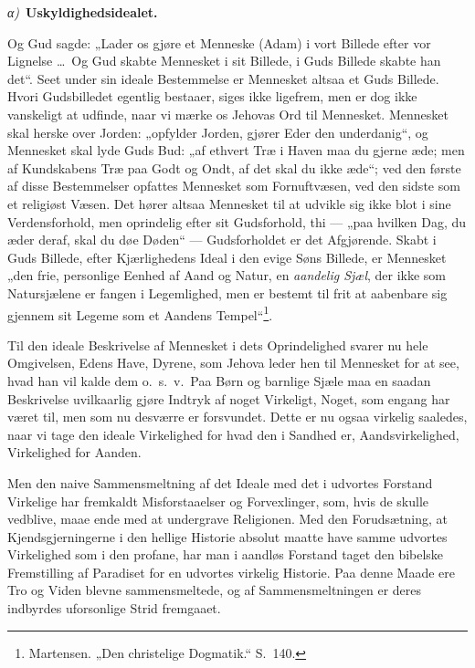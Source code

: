 \documentclass[12pt]{book}
\newcommand{\greekrun}[2]{%
  \medskip\begin{center}{\itshape #1)}\ {\bfseries #2}\end{center}\medskip}
\begin{document}
\greekrun{α}{Uskyldighedsidealet.}

Og Gud sagde: „Lader os gjøre et Menneske (Adam) i vort Billede
efter vor Lignelse \dots\ Og Gud skabte Mennesket i sit Billede, i
Guds Billede skabte han det“. Seet under sin ideale Bestemmelse er
Mennesket altsaa et Guds Billede. Hvori Gudsbilledet egentlig
bestaaer, siges ikke ligefrem, men er dog ikke vanskeligt at
udfinde, naar vi mærke os Jehovas Ord til Mennesket. Mennesket skal
herske over Jorden: „opfylder Jorden, gjører Eder den underdanig“,
og Mennesket skal lyde Guds Bud: „af
ethvert Træ i Haven maa du gjerne æde; men af Kundskabens Træ paa
Godt og Ondt, af det skal du ikke æde“; ved den første af disse
Bestemmelser opfattes Mennesket som Fornuftvæsen, ved den sidste som
et religiøst Væsen. Det hører altsaa Mennesket til at udvikle sig
ikke blot i sine Verdensforhold, men oprindelig efter sit
Gudsforhold, thi --- „paa hvilken Dag, du æder deraf, skal du døe
Døden“ --- Gudsforholdet er det Afgjørende. Skabt i Guds Billede,
efter Kjærlighedens Ideal i den evige Søns Billede, er Mennesket
„den frie, personlige Eenhed af Aand og Natur, en \emph{aandelig
Sjæl}, der ikke som Natursjælene er fangen i Legemlighed, men er
bestemt til frit at aabenbare sig gjennem sit Legeme som et Aandens
Tempel“\footnote{Martensen. „Den christelige Dogmatik.“ S.\ 140.}.

Til den ideale Beskrivelse af Mennesket i dets Oprindelighed svarer
nu hele Omgivelsen, Edens Have, Dyrene, som Jehova leder hen til
Mennesket for at see, hvad han vil kalde dem o.\ s.\ v.\ Paa Børn
og barnlige Sjæle maa en saadan Beskrivelse uvilkaarlig gjøre
Indtryk af noget Virkeligt, Noget, som engang har været til, men som
nu desværre er forsvundet. Dette er nu ogsaa virkelig saaledes, naar
vi tage den ideale Virkelighed for hvad den i Sandhed er,
Aandsvirkelighed, Virkelighed for Aanden.

Men den naive Sammensmeltning af det Ideale med det i udvortes
Forstand Virkelige har fremkaldt Misforstaaelser og Forvexlinger,
som, hvis de skulle vedblive, maae ende med at undergrave
Religionen. Med den Forudsætning, at Kjendsgjerningerne i den
hellige Historie absolut maatte have samme udvortes Virkelighed som
i den profane, har man i aandløs Forstand taget den bibelske
Fremstilling af Paradiset for en udvortes virkelig Historie. Paa
denne Maade ere Tro og Viden blevne
sammensmeltede, og af Sammensmeltningen er deres indbyrdes
uforsonlige Strid fremgaaet.
\end{document}
